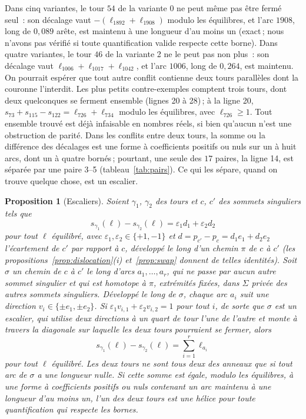 \documentclass[11pt,a4paper]{article}
\newtheorem{proposition}{Proposition}
\newcommand{\shift}{s}
\newcommand{\lean}[1]{\texttt{\detokenize{#1}}}
\newenvironment{evidence}[3][]{}{}
\begin{document}
Dans cinq variantes, le tour $54$ de la variante 0 ne peut même pas être
fermé seul~: son décalage vaut $-(\ell_{1892} + \ell_{1908})$ modulo les
équilibres, et l'arc $1908$, long de $0,089$ arête, est maintenu à une
longueur d'au moins un (exact\,; nous n'avons pas vérifié si toute
quantification valide respecte cette borne). Dans quatre variantes, le tour
$46$ de la variante 2 ne le peut pas non plus~: son décalage vaut
$\ell_{1006} + \ell_{1017} + \ell_{1042}$, et l'arc $1006$, long de $0,264$,
est maintenu. On pourrait espérer que tout autre conflit contienne deux tours
parallèles dont la couronne l'interdit. Les plus petits contre-exemples
comptent trois tours, dont deux quelconques se ferment ensemble (lignes 20 à
28)\,; à la ligne 20, $\shift_{73} + \shift_{115} - \shift_{122} =
\ell_{726} + \ell_{734}$ modulo les équilibres, avec $\ell_{726} \ge 1$. Tout
ensemble trouvé est déjà infaisable en nombres réels, si bien qu'aucun n'est
une obstruction de parité. Dans les conflits entre deux tours, la somme ou la
différence des décalages est une forme à coefficients positifs ou nuls sur un
à huit arcs, dont un à quatre bornés\,; pourtant, une seule des $17$ paires,
la ligne 14, est séparée par une paire 3--5 (tableau~\ref{tab:pairs}). Ce qui
les sépare, quand on trouve quelque chose, est un escalier.

\begin{evidence}{core}{\lean{staircase}, \lean{staircase_rings}\,; supposé~: le vecteur entre les sommets est la somme le long de l'escalier}
\begin{proposition}[Escaliers]\label{prop:staircase}
Soient $\gamma_1$, $\gamma_2$ des tours et $c$, $c'$ des sommets singuliers
tels que
\[
  \shift_{\gamma_1}(\ell) - \shift_{\gamma_2}(\ell) = \varepsilon_1 d_1 +
  \varepsilon_2 d_2
\]
pour tout $\ell$ équilibré, avec $\varepsilon_1, \varepsilon_2 \in \{+1,
-1\}$ et $d = p_{c'} - p_c = d_1 e_1 + d_2 e_2$ l'écartement de $c'$ par
rapport à $c$, développé le long d'un chemin $\pi$ de $c$ à $c'$ (les
propositions~\ref{prop:dislocation}(i) et~\ref{prop:swap} donnent de telles
identités). Soit $\sigma$ un chemin de $c$ à $c'$ le long d'arcs $a_1, \dots,
a_r$, qui ne passe par aucun autre sommet singulier et qui est homotope à
$\pi$, extrémités fixées, dans $\Sigma$ privée des autres sommets singuliers.
Développé le long de $\sigma$, chaque arc $a_i$ suit une direction $v_i \in
\{\pm e_1, \pm e_2\}$. Si $\varepsilon_1 v_{i,1} + \varepsilon_2 v_{i,2} = 1$
pour tout $i$, de sorte que $\sigma$ est un \emph{escalier}, qui utilise deux
directions à un quart de tour l'une de l'autre et monte à travers la diagonale
sur laquelle les deux tours pourraient se fermer, alors
\[
  \shift_{\gamma_1}(\ell) - \shift_{\gamma_2}(\ell) = \sum_{i=1}^r \ell_{a_i}
\]
pour tout $\ell$ équilibré. Les deux tours ne sont tous deux des anneaux que
si tout arc de $\sigma$ a une longueur nulle. Si cette somme est égale, modulo
les équilibres, à une forme à coefficients positifs ou nuls contenant un arc
maintenu à une longueur d'au moins un, l'un des deux tours est une hélice pour
toute quantification qui respecte les bornes.
\end{proposition}
\end{evidence}
\end{document}
